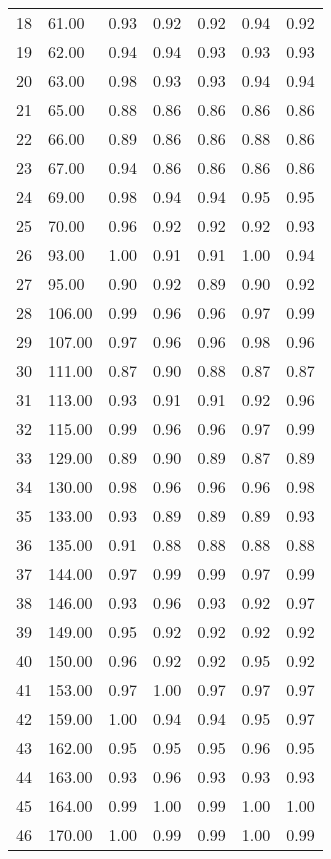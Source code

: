 \documentclass[12pt,]{article}
\begin{document}
\begin{longtable}{l|l|l|l|l|l|l}
  18 & 61.00 & 0.93 & 0.92 & 0.92 & 0.94 & 0.92 \\ 
  19 & 62.00 & 0.94 & 0.94 & 0.93 & 0.93 & 0.93 \\ 
  20 & 63.00 & 0.98 & 0.93 & 0.93 & 0.94 & 0.94 \\ 
  21 & 65.00 & 0.88 & 0.86 & 0.86 & 0.86 & 0.86 \\ 
  22 & 66.00 & 0.89 & 0.86 & 0.86 & 0.88 & 0.86 \\ 
  23 & 67.00 & 0.94 & 0.86 & 0.86 & 0.86 & 0.86 \\ 
  24 & 69.00 & 0.98 & 0.94 & 0.94 & 0.95 & 0.95 \\ 
  25 & 70.00 & 0.96 & 0.92 & 0.92 & 0.92 & 0.93 \\ 
  26 & 93.00 & 1.00 & 0.91 & 0.91 & 1.00 & 0.94 \\ 
  27 & 95.00 & 0.90 & 0.92 & 0.89 & 0.90 & 0.92 \\ 
  28 & 106.00 & 0.99 & 0.96 & 0.96 & 0.97 & 0.99 \\ 
  29 & 107.00 & 0.97 & 0.96 & 0.96 & 0.98 & 0.96 \\ 
  30 & 111.00 & 0.87 & 0.90 & 0.88 & 0.87 & 0.87 \\ 
  31 & 113.00 & 0.93 & 0.91 & 0.91 & 0.92 & 0.96 \\ 
  32 & 115.00 & 0.99 & 0.96 & 0.96 & 0.97 & 0.99 \\ 
  33 & 129.00 & 0.89 & 0.90 & 0.89 & 0.87 & 0.89 \\ 
  34 & 130.00 & 0.98 & 0.96 & 0.96 & 0.96 & 0.98 \\ 
  35 & 133.00 & 0.93 & 0.89 & 0.89 & 0.89 & 0.93 \\ 
  36 & 135.00 & 0.91 & 0.88 & 0.88 & 0.88 & 0.88 \\ 
  37 & 144.00 & 0.97 & 0.99 & 0.99 & 0.97 & 0.99 \\ 
  38 & 146.00 & 0.93 & 0.96 & 0.93 & 0.92 & 0.97 \\ 
  39 & 149.00 & 0.95 & 0.92 & 0.92 & 0.92 & 0.92 \\ 
  40 & 150.00 & 0.96 & 0.92 & 0.92 & 0.95 & 0.92 \\ 
  41 & 153.00 & 0.97 & 1.00 & 0.97 & 0.97 & 0.97 \\ 
  42 & 159.00 & 1.00 & 0.94 & 0.94 & 0.95 & 0.97 \\ 
  43 & 162.00 & 0.95 & 0.95 & 0.95 & 0.96 & 0.95 \\ 
  44 & 163.00 & 0.93 & 0.96 & 0.93 & 0.93 & 0.93 \\ 
  45 & 164.00 & 0.99 & 1.00 & 0.99 & 1.00 & 1.00 \\ 
  46 & 170.00 & 1.00 & 0.99 & 0.99 & 1.00 & 0.99 \\ 

\end{longtable}
\end{document}
